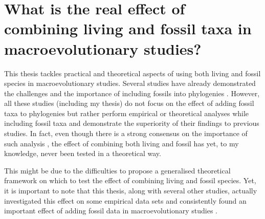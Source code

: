 \section{What is the real effect of combining living and fossil taxa in macroevolutionary studies?} %
This thesis tackles practical and theoretical aspects of using both living and fossil species in macroevolutionary studies.
Several studies have already demonstrated the challenges and the importance of including fossils into phylogenies \citep[e.g.][]{ronquista2012,slaterphylogenetic2013,Wood01032013,beckancient2014,Dembo2015}.
However, all these studies (including my thesis) do not focus on the effect of adding fossil taxa to phylogenies but rather perform empirical or theoretical analyses while including fossil taxa and demonstrate the superiority of their findings to previous studies.
In fact, even though there is a strong consensus on the importance of such analysis \citep{jacksonwhat2006,quentaldiversity2010,dietlconservation2011,slaterunifying2013,fritzdiversity2013,benton2015}, the effect of combining both living and fossil has yet, to my knowledge, never been tested in a theoretical way.

This might be due to the difficulties to propose a generalised theoretical framework on which to test the effect of combining living and fossil species.
Yet, it is important to note that this thesis, along with several other studies, actually investigated this effect on some empirical data sets and consistently found an important effect of adding fossil data in macroevolutionary studies \citep{Finarelli2006,Slateretal2012,slaterphylogenetic2013,SlaterPennel2014,pant2014complex,Mitchell2015}. %

